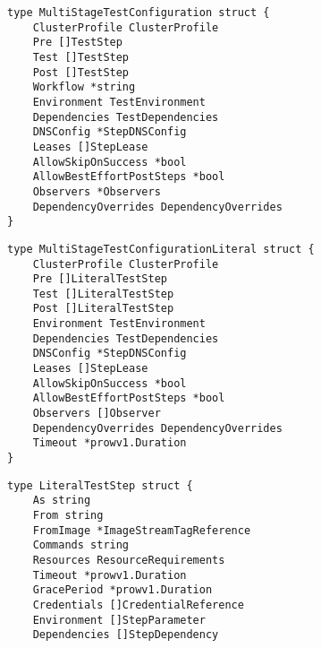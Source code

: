 \begin{frame}[fragile]
    \autotitle
    \begin{verbatim}
type MultiStageTestConfiguration struct {
    ClusterProfile ClusterProfile
    Pre []TestStep
    Test []TestStep
    Post []TestStep
    Workflow *string
    Environment TestEnvironment
    Dependencies TestDependencies
    DNSConfig *StepDNSConfig
    Leases []StepLease
    AllowSkipOnSuccess *bool
    AllowBestEffortPostSteps *bool
    Observers *Observers
    DependencyOverrides DependencyOverrides
}
    \end{verbatim}
\end{frame}

\begin{frame}[fragile]
    \autotitle
    \begin{verbatim}
type MultiStageTestConfigurationLiteral struct {
    ClusterProfile ClusterProfile
    Pre []LiteralTestStep
    Test []LiteralTestStep
    Post []LiteralTestStep
    Environment TestEnvironment
    Dependencies TestDependencies
    DNSConfig *StepDNSConfig
    Leases []StepLease
    AllowSkipOnSuccess *bool
    AllowBestEffortPostSteps *bool
    Observers []Observer
    DependencyOverrides DependencyOverrides
    Timeout *prowv1.Duration
}
    \end{verbatim}
\end{frame}

\begin{frame}[fragile]
    \autotitle
    \begin{verbatim}
type LiteralTestStep struct {
    As string
    From string
    FromImage *ImageStreamTagReference
    Commands string
    Resources ResourceRequirements
    Timeout *prowv1.Duration
    GracePeriod *prowv1.Duration
    Credentials []CredentialReference
    Environment []StepParameter
    Dependencies []StepDependency
    \end{verbatim}
\end{frame}

